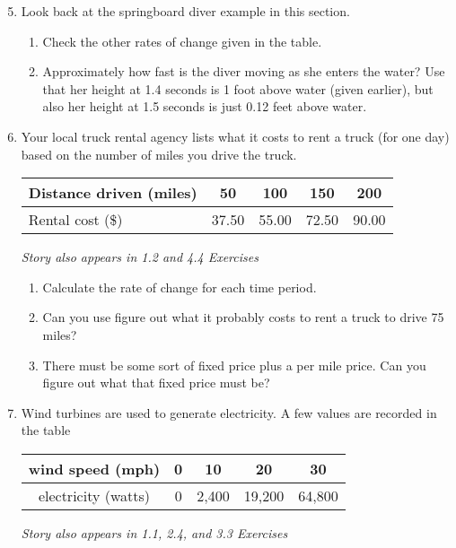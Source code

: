 \begin{enumerate} 
\setcounter{enumi}{4}
\item Look back at the springboard diver example in this section. 
\begin{enumerate}
\item  Check the other rates of change given in the table.
\item Approximately how fast is the diver moving as she enters the water?  Use that her height at 1.4 seconds is 1 foot above water (given earlier), but also her height at 1.5 seconds is just 0.12 feet above water.
\end{enumerate}

\item Your local truck rental agency lists what it costs to rent a truck (for one day) based on the number of miles you drive the truck.  
\begin{center}
\begin{tabular} {|l| |c |c|c|c|} \hline
Distance driven (miles) & 50 & 100 & 150 & 200 \\ \hline
Rental cost (\$) & 37.50 & 55.00 & 72.50 & 90.00 \\ \hline
\end{tabular}
\end{center}
 \hfill \emph{Story also appears in 1.2 and 4.4 Exercises}
\begin{enumerate}
\item Calculate the rate of change for each time period.
\item Can you use figure out what it probably costs to rent a truck to drive 75 miles?
\item There must be some sort of fixed price plus a per mile price.  Can you figure out what that fixed price must be?  
\end{enumerate}

\item Wind turbines are used to generate electricity.  A few values are recorded in the table
\begin{center}
\begin{tabular} {|c| |c |c|c |c|}\hline
wind speed (mph) & 0 & 10 & 20 & 30 \\ \hline
electricity (watts) & 0 & 2,400 & 19,200 & 64,800 \\ \hline
\end{tabular}
\end{center}
\hfill \emph{Story also appears in 1.1, 2.4, and 3.3 Exercises}


\end{enumerate}

